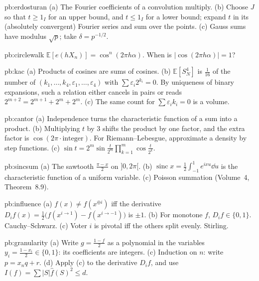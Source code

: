 \begin{hint}{pb:erdosturan}
(a) The Fourier coefficients of a convolution multiply. (b) Choose $J$ so that $t\ge1_I$ for an upper bound, and $t\le1_I$ for a lower
bound; expand $t$ in its (absolutely convergent) Fourier series and sum over the points. (c) Gauss sums have modulus $\sqrt p$;
take $\delta=p^{-1/2}$.
\end{hint}

\begin{hint}{pb:circlewalk}
$\mathbb E[e(hX_n)]=\cos^n(2\pi h\alpha)$. When is $|\cos(2\pi h\alpha)|=1$?
\end{hint}

\begin{hint}{pb:kac}
(a) Products of cosines are sums of cosines. (b) $\mathbb E[S_N^4]$ is $\frac1{16}$ of the number of $(k_1,\dots,k_4,\varepsilon_1,\dots,\varepsilon_4)$ with
$\sum\varepsilon_i2^{k_i}=0$. By uniqueness of binary expansions, such a relation either cancels in pairs or reads $2^{m+2}=2^{m+1}+2^m+2^m$.
(c) The same count for $\sum\varepsilon_ik_i=0$ is a volume.
\end{hint}

\begin{hint}{pb:cantor}
(a) Independence turns the characteristic function of a sum into a product. (b) Multiplying $t$ by $3$ shifts the product by one
factor, and the extra factor is $\cos(2\pi\cdot\text{integer})$. For Riemann--Lebesgue, approximate a density by step functions.
(c) $\sin t=2^m\sin\frac t{2^m}\prod_{k=1}^m\cos\frac t{2^k}$.
\end{hint}

\begin{hint}{pb:sincsum}
(a) The sawtooth $\frac{\pi-x}2$ on $]0,2\pi[$. (b) $\operatorname{sinc}x=\frac12\int_{-1}^1e^{ixu}\dd u$ is the characteristic function of a uniform variable.
(c) Poisson summation (Volume~4, Theorem~8.9).
\end{hint}

\begin{hint}{pb:influence}
(a) $f(x)\ne f(x^{\oplus i})$ iff the derivative $D_if(x)=\frac12\bigl(f(x^{i\to1})-f(x^{i\to-1})\bigr)$ is $\pm1$. (b) For monotone $f$, $D_if\in\{0,1\}$.
Cauchy--Schwarz. (c) Voter $i$ is pivotal iff the others split evenly. Stirling.
\end{hint}

\begin{hint}{pb:granularity}
(a) Write $g=\frac{1-f}2$ as a polynomial in the variables $y_i=\frac{1-x_i}2\in\{0,1\}$: its coefficients are integers. (c) Induction on $n$:
write $p=x_nq+r$. (d) Apply (c) to the derivative $D_if$, and use $I(f)=\sum|S|\hat f(S)^2\le d$.
\end{hint}

